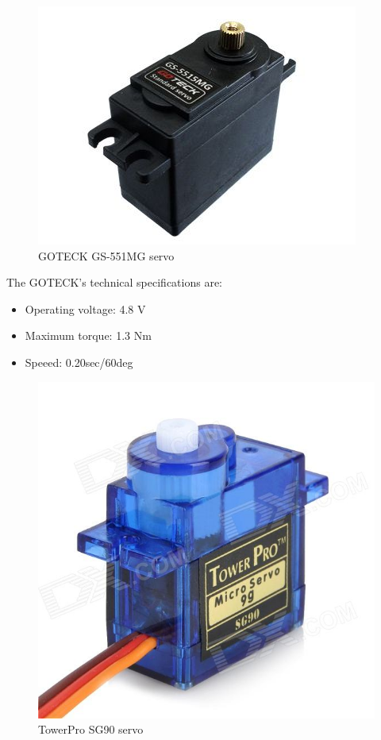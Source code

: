 		\begin{figure}[H]
			\centering
			\includegraphics[scale=0.5]{images/ProjectComponents/servo1.jpg}
			\caption{GOTECK GS-551MG servo }
			\label{goteck}
		\end{figure}
		\bigskip

	The GOTECK's technical specifications are:
			\begin{itemize}
				\item Operating voltage: 4.8 V
				\item Maximum torque: 1.3 Nm    
				\item Speeed: 0.20sec/60deg
			\end{itemize}	

		\begin{figure}[H]
			\centering
			\includegraphics[scale=0.25]{images/ProjectComponents/servo2.jpg}
			\caption{TowerPro SG90 servo }
			\label{towerpro}
		\end{figure}
		\bigskip

